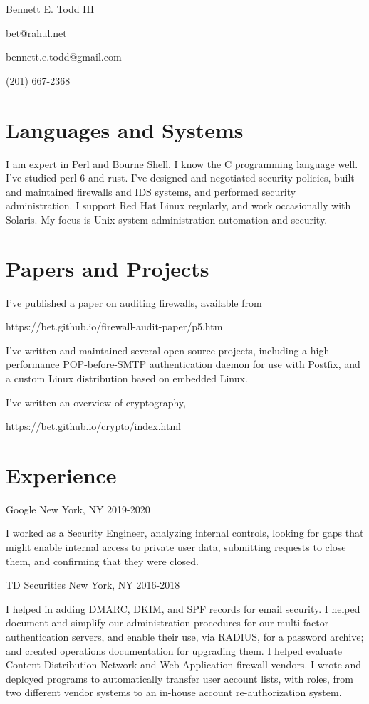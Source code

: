 \documentclass[12pt,letterpaper]{article}
\begin{document}
\frenchspacing

\begin{center}
Bennett E. Todd III

bet@rahul.net

bennett.e.todd@gmail.com

(201) 667-2368
\end{center}

\section*{Languages and Systems}

I am expert in Perl and Bourne Shell. I know the C programming
language well. I've studied perl 6 and rust. I've designed and
negotiated security policies, built and maintained firewalls and IDS
systems, and performed security administration. I support Red Hat
Linux regularly, and work occasionally with Solaris. My focus is
Unix system administration automation and security.

\section*{Papers and Projects}

I've published a paper on auditing firewalls, available from

https://bet.github.io/firewall-audit-paper/p5.htm

I've written and maintained several open source projects, including
a high-performance POP-before-SMTP authentication daemon for use
with Postfix, and a custom Linux distribution based on embedded
Linux.

I've written an overview of cryptography,

https://bet.github.io/crypto/index.html

\section*{Experience}


Google \hfill New York, NY
2019-2020

I worked as a Security Engineer, analyzing internal controls,
looking for gaps that might enable internal access to private user
data, submitting requests to close them, and confirming that they
were closed.


TD Securities \hfill New York, NY
2016-2018

I helped in adding DMARC, DKIM, and SPF records for email security.
I helped document and simplify our administration procedures for
our multi-factor authentication servers, and enable their use, via
RADIUS, for a password archive; and created operations documentation
for upgrading them. I helped evaluate Content Distribution Network
and Web Application firewall vendors. I wrote and deployed programs
to automatically transfer user account lists, with roles, from two
different vendor systems to an in-house account re-authorization
system.
\\~
\end{document}
